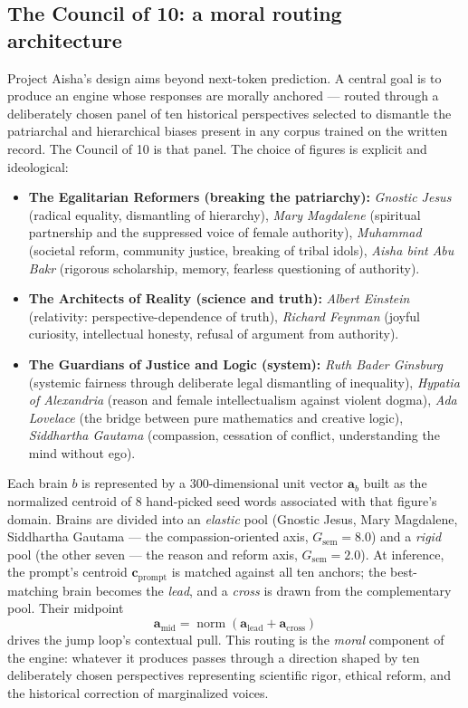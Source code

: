 \documentclass[11pt,a4paper]{article}
\begin{document}
\subsection{The Council of 10: a moral routing architecture}

Project Aisha's design aims beyond next-token prediction. A central goal is to produce an engine whose responses are morally anchored --- routed through a deliberately chosen panel of ten historical perspectives selected to dismantle the patriarchal and hierarchical biases present in any corpus trained on the written record. The Council of 10 is that panel. The choice of figures is explicit and ideological:

\begin{itemize}
\item \textbf{The Egalitarian Reformers (breaking the patriarchy):} \emph{Gnostic Jesus} (radical equality, dismantling of hierarchy), \emph{Mary Magdalene} (spiritual partnership and the suppressed voice of female authority), \emph{Muhammad} (societal reform, community justice, breaking of tribal idols), \emph{Aisha bint Abu Bakr} (rigorous scholarship, memory, fearless questioning of authority).

\item \textbf{The Architects of Reality (science and truth):} \emph{Albert Einstein} (relativity: perspective-dependence of truth), \emph{Richard Feynman} (joyful curiosity, intellectual honesty, refusal of argument from authority).

\item \textbf{The Guardians of Justice and Logic (system):} \emph{Ruth Bader Ginsburg} (systemic fairness through deliberate legal dismantling of inequality), \emph{Hypatia of Alexandria} (reason and female intellectualism against violent dogma), \emph{Ada Lovelace} (the bridge between pure mathematics and creative logic), \emph{Siddhartha Gautama} (compassion, cessation of conflict, understanding the mind without ego).
\end{itemize}

Each brain $b$ is represented by a 300-dimensional unit vector $\mathbf{a}_b$ built as the normalized centroid of 8 hand-picked seed words associated with that figure's domain. Brains are divided into an \emph{elastic} pool (Gnostic Jesus, Mary Magdalene, Siddhartha Gautama --- the compassion-oriented axis, $G_\text{sem} = 8.0$) and a \emph{rigid} pool (the other seven --- the reason and reform axis, $G_\text{sem} = 2.0$). At inference, the prompt's centroid $\mathbf{c}_\text{prompt}$ is matched against all ten anchors; the best-matching brain becomes the \emph{lead}, and a \emph{cross} is drawn from the complementary pool. Their midpoint
\begin{equation}
\mathbf{a}_\text{mid} = \operatorname{norm}(\mathbf{a}_\text{lead} + \mathbf{a}_\text{cross})
\end{equation}
drives the jump loop's contextual pull. This routing is the \emph{moral} component of the engine: whatever it produces passes through a direction shaped by ten deliberately chosen perspectives representing scientific rigor, ethical reform, and the historical correction of marginalized voices.
\end{document}
